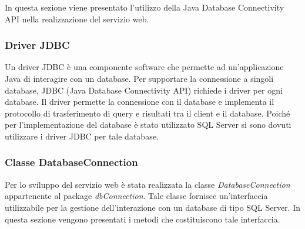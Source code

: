 In questa sezione viene presentato l'utilizzo della Java Database Connectivity API nella realizzazione del servizio web.

\subsubsection{Driver JDBC}

Un driver JDBC è una componente software che permette ad un'applicazione Java di interagire con un database. Per supportare la connessione a singoli database, JDBC (Java Database Connectivity API) richiede i driver per ogni database. Il driver permette la connessione con il database e implementa il protocollo di trasferimento di query e risultati tra il client e il database. Poiché per l'implementazione del database è stato utilizzato SQL Server si sono dovuti utilizzare i driver JDBC per tale database.

\subsubsection{Classe DatabaseConnection} \label{dbconnect}

Per lo sviluppo del servizio web è stata realizzata la classe \textit{DatabaseConnection} appartenente al package \textit{dbConnection}. Tale classe fornisce un'interfaccia utilizzabile per la gestione dell'interazione con un database di tipo SQL Server. In questa sezione vengono presentati i metodi che costituiscono tale interfaccia.


